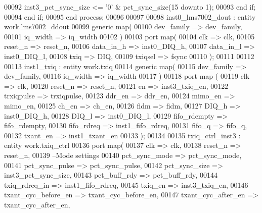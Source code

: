 \begin{DoxyCode}
00092          inst3\_pct\_sync\_size <= '0' & pct\_sync\_size(\textcolor{vhdllogic}{15} \textcolor{keywordflow}{downto} \textcolor{vhdllogic}{1}); 
00093       \textcolor{keywordflow}{end} \textcolor{keywordflow}{if};
00094    \textcolor{keywordflow}{end} \textcolor{keywordflow}{if};
00095 \textcolor{keywordflow}{end} \textcolor{keywordflow}{process};
00096 
00097         
00098 inst0\_lms7002\_dout : \textcolor{keywordflow}{entity} work.lms7002_ddout
00099    \textcolor{keywordflow}{generic} \textcolor{keywordflow}{map}( 
00100       dev_family  => dev_family,
00101       iq_width    => iq_width
00102    \textcolor{vhdlchar}{)}
00103    \textcolor{keywordflow}{port} \textcolor{keywordflow}{map}(
00104       clk         => clk,
00105       reset_n     => reset_n,
00106       data_in_h   => inst0_DIQ_h,
00107       data_in_l   => inst0_DIQ_l,
00108       txiq        => DIQ,
00109       txiqsel     => fsync
00110       \textcolor{vhdlchar}{)};
00111         
00112         
00113  inst1\_txiq : \textcolor{keywordflow}{entity} work.txiq
00114    \textcolor{keywordflow}{generic} \textcolor{keywordflow}{map}( 
00115       dev_family     => dev_family,
00116       iq_width       => iq_width
00117    \textcolor{vhdlchar}{)}
00118    \textcolor{keywordflow}{port} \textcolor{keywordflow}{map} (
00119       clk            => clk,
00120       reset_n        => reset_n,
00121       en             => inst3_txiq_en,
00122       trxiqpulse     => trxiqpulse,
00123       ddr_en         => ddr_en,
00124       mimo_en        => mimo_en,
00125       ch_en          => ch_en, 
00126       fidm           => fidm,
00127       DIQ_h          => inst0_DIQ_h,
00128       DIQ_l          => inst0_DIQ_l,
00129       fifo_rdempty   => fifo_rdempty,
00130       fifo_rdreq     => inst1_fifo_rdreq,
00131       fifo_q         => fifo_q,
00132       txant_en       => inst1_txant_en
00133         \textcolor{vhdlchar}{)};
00134         
00135 txiq\_ctrl\_inst3 : \textcolor{keywordflow}{entity} work.txiq_ctrl
00136    \textcolor{keywordflow}{port} \textcolor{keywordflow}{map}(
00137       clk                  => clk,
00138       reset_n              => reset_n,
00139 \textcolor{keyword}{      --Mode settings}
00140       pct_sync_mode        => pct_sync_mode,
00141       pct_sync_pulse       => pct_sync_pulse,
00142       pct_sync_size        => inst3_pct_sync_size,
00143       pct_buff_rdy         => pct_buff_rdy,
00144       txiq_rdreq_in        => inst1_fifo_rdreq,
00145       txiq_en              => inst3_txiq_en,
00146       txant_cyc_before_en  => txant_cyc_before_en,
00147       txant_cyc_after_en   => txant_cyc_after_en,

\end{DoxyCode}
